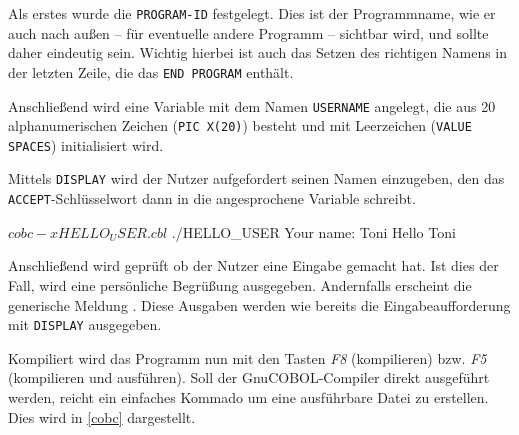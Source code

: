 Als erstes wurde die \texttt{PROGRAM-ID} festgelegt. Dies ist der Programmname, wie er auch nach außen -- für eventuelle andere Programm -- sichtbar wird, und sollte daher eindeutig sein. Wichtig hierbei ist auch das Setzen des richtigen Namens in der letzten Zeile, die das \texttt{END PROGRAM} enthält.

Anschließend wird eine Variable mit dem Namen \texttt{USERNAME} angelegt, die aus 20 alphanumerischen Zeichen (\texttt{PIC X(20)}) besteht und mit Leerzeichen (\texttt{VALUE SPACES}) initialisiert wird.

Mittels \texttt{DISPLAY} wird der Nutzer aufgefordert seinen Namen einzugeben, den das \texttt{ACCEPT}-Schlüsselwort dann in die angesprochene Variable schreibt.

\begin{shellwindow}
$ cobc -x HELLO_USER.cbl
$ ./HELLO_USER
Your name: Toni
Hello Toni
\end{shellwindow}

Anschließend wird geprüft ob der Nutzer eine Eingabe gemacht hat. Ist dies der Fall, wird eine persönliche Begrüßung ausgegeben. Andernfalls erscheint die generische Meldung . Diese Ausgaben werden wie bereits die Eingabeaufforderung mit \texttt{DISPLAY} ausgegeben.

Kompiliert wird das Programm nun mit den Tasten \textit{F8} (kompilieren) bzw. \textit{F5} (kompilieren und ausführen). Soll der GnuCOBOL-Compiler direkt ausgeführt werden, reicht ein einfaches Kommado um eine ausführbare Datei zu erstellen. Dies wird in \autoref{cobc} dargestellt.